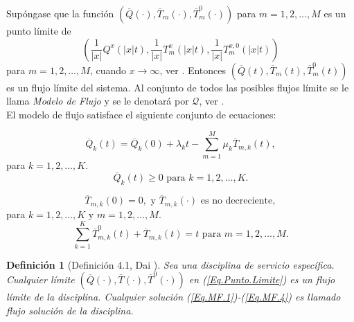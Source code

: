 \documentclass{article}
\newtheorem{Def}{Definición}
\begin{document}
Sup\'ongase que la funci\'on $\left(\overline{Q}\left(\cdot\right),\overline{T}_{m} \left(\cdot\right),\overline{T}_{m}^{0} \left(\cdot\right)\right)$
para $m=1,2,\ldots,M$ es un punto l\'imite de
\begin{equation}\label{Eq.Punto.Limite}
\left(\frac{1}{|x|}Q^{x}\left(|x|t\right),\frac{1}{|x|}T_{m}^{x}\left(|x|t\right),\frac{1}{|x|}T_{m}^{x,0}\left(|x|t\right)\right)
\end{equation}
para $m=1,2,\ldots,M$, cuando $x\rightarrow\infty$, ver \cite{Down}. Entonces $\left(\overline{Q}\left(t\right),\overline{T}_{m} \left(t\right),\overline{T}_{m}^{0} \left(t\right)\right)$ es un flujo l\'imite del sistema. Al conjunto de todos las posibles flujos l\'imite se le llama {\emph{Modelo de Flujo}} y se le denotar\'a por $\mathcal{Q}$, ver \cite{Down, Dai, DaiSean}.\\

El modelo de flujo satisface el siguiente conjunto de ecuaciones:

\begin{equation}\label{Eq.MF.1}
\overline{Q}_{k}\left(t\right)=\overline{Q}_{k}\left(0\right)+\lambda_{k}t-\sum_{m=1}^{M}\mu_{k}\overline{T}_{m,k}\left(t\right),
\end{equation}
para $k=1,2,\ldots,K$.\\

\begin{equation}\label{Eq.MF.2}
\overline{Q}_{k}\left(t\right)\geq0\textrm{ para }k=1,2,\ldots,K.
\end{equation}

\begin{equation}\label{Eq.MF.3}
\overline{T}_{m,k}\left(0\right)=0,\textrm{ y }\overline{T}_{m,k}\left(\cdot\right)\textrm{ es no decreciente},
\end{equation}
para $k=1,2,\ldots,K$ y $m=1,2,\ldots,M$.\\
\begin{equation}\label{Eq.MF.4}
\sum_{k=1}^{K}\overline{T}_{m,k}^{0}\left(t\right)+\overline{T}_{m,k}\left(t\right)=t\textrm{ para }m=1,2,\ldots,M.
\end{equation}


\begin{Def}[Definici\'on 4.1, Dai \cite{Dai}]\label{Def.Modelo.Flujo}
Sea una disciplina de servicio espec\'ifica. Cualquier l\'imite $\left(\overline{Q}\left(\cdot\right),\overline{T}\left(\cdot\right),\overline{T}^{0}\left(\cdot\right)\right)$ en (\ref{Eq.Punto.Limite}) es un {\em flujo l\'imite} de la disciplina. Cualquier soluci\'on (\ref{Eq.MF.1})-(\ref{Eq.MF.4}) es llamado flujo soluci\'on de la disciplina.
\end{Def}
\end{document}
